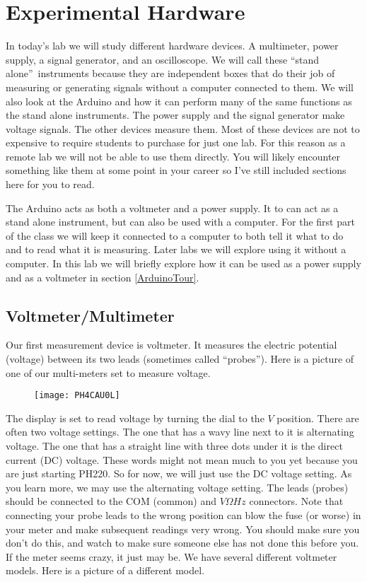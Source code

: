 \section{Experimental Hardware}

In today's lab we will study different hardware devices. A multimeter, power supply, a signal generator, and an oscilloscope. We will call these \textquotedblleft stand alone\textquotedblright\ instruments because they are independent boxes that do their job of measuring or generating signals without a computer connected to them. We will also look at the Arduino and how it can perform many of the same functions as the stand alone instruments. The power supply and the signal generator make voltage signals. The other devices measure them. Most of these devices are not to expensive to require students to purchase for just one lab. For this reason as a remote lab we will not be able to use them directly. You will likely encounter something like them at some point in your career so I've still included sections here for you to read. 

The Arduino acts as both a voltmeter and a power supply. It to can act as a stand alone instrument, but can also be used with a computer. For the first part of the class we will keep it connected to a computer to both tell it what to do and to read what it is measuring. Later labs we will explore using it without a computer. In this lab we will briefly explore how it can be used as a power supply and as a voltmeter in section \ref{ArduinoTour}. 

\subsection{Voltmeter/Multimeter}

Our first measurement device is voltmeter. It measures the electric potential (voltage) between its two leads (sometimes called \textquotedblleft probes\textquotedblright ). Here is a picture of one of our multi-meters set to measure voltage.

\begin{figure}[h!]
	\texttt{[image: PH4CAU0L]}
\end{figure}

The display is set to read voltage by turning the dial to the $\unit{V}$ position. There are often two voltage settings. The one that has a wavy line next to it is alternating voltage. The one that has a straight line with three dots under it is the direct current (DC) voltage. These words might not mean much to you yet because you are just starting PH220. So for now, we will just use the DC voltage setting. As you learn more, we may use the alternating voltage setting. The leads (probes) should be connected to the COM (common) and $\unit{V}\unit{\Omega}\unit{Hz}$ connectors. Note that connecting your probe leads to the wrong position can blow the fuse (or worse) in your meter and make subsequent readings very wrong. You should make sure you don't do this, and watch to make sure someone else has not done this before you. If the meter seems crazy, it just may be. We have several different voltmeter models. Here is a picture of a different model.

